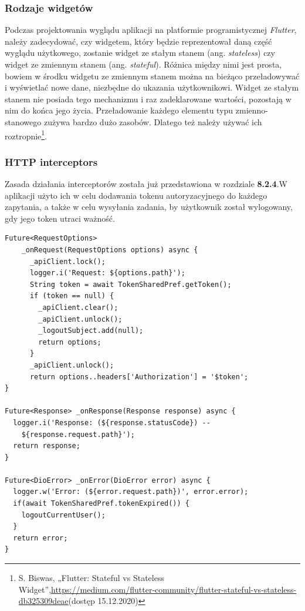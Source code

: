 \documentclass[twoside]{projektInzynierskiMS}
\numberwithin{figure}{section}
\begin{document}
\subsubsection{Rodzaje widgetów}

Podczas projektowania wyglądu aplikacji na platformie programistycznej \textit{Flutter}, należy zadecydować, czy widgetem, który będzie reprezentował daną część wyglądu użytkowego, zostanie widget ze stałym stanem (ang. \textit{stateless}) czy widget ze zmiennym stanem (ang. \textit{stateful}). Różnica między nimi jest prosta, bowiem w środku widgetu ze zmiennym stanem można na bieżąco przeładowywać i wyświetlać nowe dane, niezbędne do ukazania użytkownikowi. Widget ze stałym stanem nie posiada tego mechanizmu i raz zadeklarowane wartości, pozostają w nim do końca jego życia. Przeładowanie każdego elementu typu zmienno-stanowego zużywa bardzo dużo zasobów. Dlatego też należy używać ich roztropnie\footnote{S. Biswas, „Flutter: Stateful vs Stateless Widget”,\newline \url{https://medium.com/flutter-community/flutter-stateful-vs-stateless-db325309deae}\newline (dostęp 15.12.2020)}.

\subsubsection{HTTP interceptors}

Zasada działania interceptorów została już przedstawiona w rozdziale \textbf{8.2.4}.\linebreak W aplikacji użyto ich w celu dodawania tokenu autoryzacyjnego do każdego zapytania, a także w celu wysyłania zadania, by użytkownik został wylogowany, gdy jego token utraci ważność.
\begin{lstlisting}[caption=Implementacja interceptorów. Źródło: Opracowanie własne.,captionpos=b]
Future<RequestOptions> 
    _onRequest(RequestOptions options) async {
      _apiClient.lock();
      logger.i('Request: ${options.path}');
      String token = await TokenSharedPref.getToken();
      if (token == null) {
        _apiClient.clear();
        _apiClient.unlock();
        _logoutSubject.add(null);
        return options;
      }
      _apiClient.unlock();
      return options..headers['Authorization'] = '$token';
}

Future<Response> _onResponse(Response response) async {
  logger.i('Response: (${response.statusCode}) -- 
    ${response.request.path}');
  return response;
}

Future<DioError> _onError(DioError error) async {
  logger.w('Error: (${error.request.path})', error.error);
  if(await TokenSharedPref.tokenExpired()) {
    logoutCurrentUser();
  }
  return error;
}
\end{lstlisting}
\newpage
\end{document}
